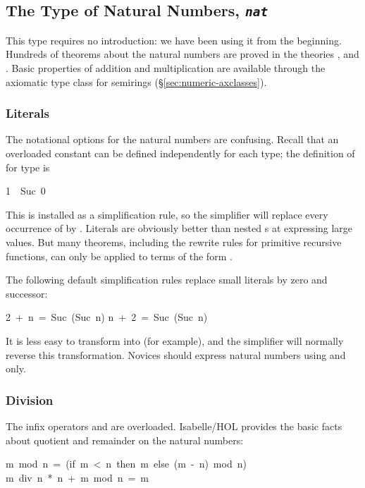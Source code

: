 \subsection{The Type of Natural Numbers, {\tt\slshape nat}}

%
This type requires no introduction: we have been using it from the
beginning.  Hundreds of theorems about the natural numbers are
proved in the theories ,  and .  
Basic properties of addition and multiplication are available through the
axiomatic type class for semirings (\S\ref{sec:numeric-axclasses}).

\subsubsection{Literals}
%
The notational options for the natural  numbers are confusing.  Recall that an
overloaded constant can be defined independently for each type; the definition
of  for type  is
\begin{isabelle}
1\ \isasymequiv\ Suc\ 0
\end{isabelle}
This is installed as a simplification rule, so the simplifier will replace
every occurrence of  by .  Literals are obviously
better than nested s at expressing large values.  But many theorems,
including the rewrite rules for primitive recursive functions, can only be
applied to terms of the form .

The following default  simplification rules replace
small literals by zero and successor: 
\begin{isabelle}
2\ +\ n\ =\ Suc\ (Suc\ n)
\isanewline
n\ +\ 2\ =\ Suc\ (Suc\ n)
\end{isabelle}
It is less easy to transform  into  (for example), and
the simplifier will normally reverse this transformation.  Novices should
express natural numbers using  and  only.

\subsubsection{Division}
%
The infix operators  and  are overloaded.
Isabelle/HOL provides the basic facts about quotient and remainder
on the natural numbers:
\begin{isabelle}
m\ mod\ n\ =\ (if\ m\ <\ n\ then\ m\ else\ (m\ -\ n)\ mod\ n)
\isanewline
m\ div\ n\ *\ n\ +\ m\ mod\ n\ =\ m%
\end{isabelle}

